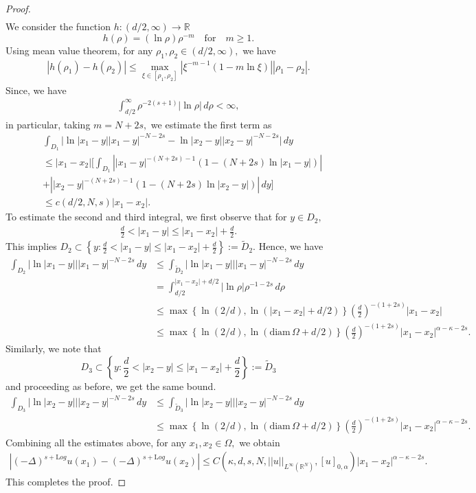 \documentclass[notitlepage,11pt,reqno]{amsart}
\theoremstyle{definition}
\numberwithin{equation}{section}
\newcommand{\RR}{\mathds{R}}
\begin{document}
\begin{proof}
\begin{align*}
\end{align*}
We consider the function $h: (d/2, \infty)\to \mathbb{R}$ 
\[h(\rho)=(\ln \rho)\rho^{-m}\quad \text{for}\quad m\geq 1.\] Using mean value theorem, for any $\rho_1, \rho_2\in (d/2, \infty),$ we have
\begin{align*}
    \left|h(\rho_1)-h(\rho_2)\right|\leq \max_{\xi \in [\rho_1, \rho_2]}\left|\xi^{-m-1}(1-m\ln \xi)\right||\rho_1-\rho_2|.
\end{align*}
Since, we have 
\begin{align*}
    \int_{d/2}^{\infty}\rho^{-2(s+1)}|\ln \rho|\, d\rho< \infty,
\end{align*} in particular, taking $m=N+2s,$
we estimate the first term as
\begin{align*}
 &\int_{D_1}\Big|\ln |x_1-y||x_1-y|^{-N-2s}-\ln |x_2-y||x_2-y|^{-N-2s}\Big|\, dy\\
 &\leq |x_1-x_2|\Bigg[\int_{D_1}\left||x_1-y|^{-(N+2s)-1}\left(1-(N+2s)\ln |x_1-y|\right)\right|\\
 &+\left||x_2-y|^{-(N+2s)-1}\left(1-(N+2s)\ln |x_2-y|\right)\right|\,dy\Bigg]\\
 &\leq c(d/2, N, s)|x_1-x_2|.
\end{align*}
To estimate the second and third integral, we first observe that for $y \in D_2,$
\begin{align*}
\frac{d}{2}< |x_1-y|\leq |x_1-x_2|+ \frac{d}{2}.
\end{align*}
This implies $D_2 \subset \left\{y : \frac{d}{2}< |x_1-y|\leq |x_1-x_2|+ \frac{d}{2}\right\}:=\widetilde D_2.$ Hence, we have
\begin{align*}
  \int_{D_2}|\ln |x_1-y|||x_1-y|^{-N-2s}\, dy &\leq \int_{\widetilde D_2} |\ln |x_1-y|||x_1-y|^{-N-2s}\, dy\\
  &=\int_{d/2}^{|x_1-x_2|+d/2}|\ln \rho|\rho^{-1-2s}\,d\rho\\
  &\leq \max\left\{\ln (2/d), \ln (|x_1-x_2|+d/2)\right\}(\frac{d}{2})^{-(1+2s)}|x_1-x_2|\\
  &\leq \max\left\{\ln (2/d), \ln (\text{diam}\, \Omega+d/2)\right\}(\frac{d}{2})^{-(1+2s)}|x_1-x_2|^{\alpha-\kappa-2s}.
\end{align*}
Similarly, we note that 
\[D_3 \subset \left\{y : \frac{d}{2}< |x_2-y|\leq |x_1-x_2|+ \frac{d}{2} \right\}:=\widetilde D_3\] and proceeding as before, we get the same bound.
\begin{align*}
\int_{D_3}|\ln |x_2-y|||x_2-y|^{-N-2s}\, dy &\leq \int_{\widetilde D_3} |\ln |x_2-y|||x_2-y|^{-N-2s}\, dy\\
&\leq  \max\left\{\ln (2/d), \ln (\text{diam}\, \Omega+d/2)\right\}(\frac{d}{2})^{-(1+2s)}|x_1-x_2|^{\alpha-\kappa-2s}.
\end{align*}
Combining all the estimates above, for any $x_1, x_2 \in \Omega,$ we obtain 
\begin{align*}
|(-\Delta)^{s+\mathrm Log} u(x_1)-(-\Delta)^{s+\mathrm Log}u(x_2)| \leq C(\kappa, d, s, N,  ||u||_{L^{\infty}(\RR^N)}, [u]_{0, \alpha})|x_1-x_2|^{\alpha-\kappa-2s}.
\end{align*} This completes the proof. 
\end{proof}
\end{document}
